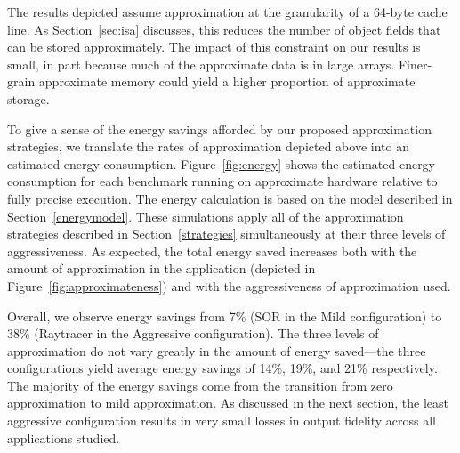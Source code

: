 The results depicted assume approximation at the granularity of a
64-byte cache line. As Section~\ref{sec:isa} discusses, this
reduces the number of object fields that can be stored
approximately. The impact of this constraint on our
results is small, in part because much of the approximate data is
in large arrays. Finer-grain approximate memory could yield a
higher proportion of approximate storage.




To give a sense of the energy savings afforded by our proposed
approximation strategies, we translate the rates of approximation depicted
above into an estimated energy consumption. Figure~\ref{fig:energy}
shows the estimated energy consumption for each benchmark running on
approximate hardware relative to fully precise execution.
The energy calculation is based on the model
described in Section~\ref{energymodel}. These simulations apply
all of the approximation strategies described in
Section~\ref{strategies} simultaneously at their three levels of
aggressiveness. As expected, the total energy saved increases both with
the amount of approximation in the application (depicted in
Figure~\ref{fig:approximateness}) and with
the aggressiveness of approximation used.

Overall, we observe energy savings from 7\% (SOR in the Mild
configuration) to 38\% (Raytracer in the Aggressive
configuration). The three levels of approximation do not vary greatly
in the amount of energy saved---the three configurations yield average
energy savings of 14\%, 19\%, and 21\% respectively. The majority of
the energy savings come from the transition from zero approximation to
mild approximation. As discussed in the next section, the least
aggressive configuration results in very small losses in output
fidelity across all applications studied.

